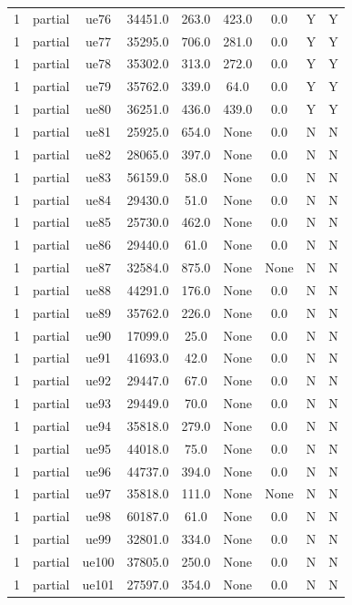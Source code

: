 \begin{table}[ht]
\begin{tabular}{|c|c|c|c|c|c|c|c|c|}
1 & partial & ue76 & 34451.0 & 263.0 & 423.0 & 0.0 & Y & Y \\
1 & partial & ue77 & 35295.0 & 706.0 & 281.0 & 0.0 & Y & Y \\
1 & partial & ue78 & 35302.0 & 313.0 & 272.0 & 0.0 & Y & Y \\
1 & partial & ue79 & 35762.0 & 339.0 & 64.0 & 0.0 & Y & Y \\
1 & partial & ue80 & 36251.0 & 436.0 & 439.0 & 0.0 & Y & Y \\
1 & partial & ue81 & 25925.0 & 654.0 & None & 0.0 & N & N \\
1 & partial & ue82 & 28065.0 & 397.0 & None & 0.0 & N & N \\
1 & partial & ue83 & 56159.0 & 58.0 & None & 0.0 & N & N \\
1 & partial & ue84 & 29430.0 & 51.0 & None & 0.0 & N & N \\
1 & partial & ue85 & 25730.0 & 462.0 & None & 0.0 & N & N \\
1 & partial & ue86 & 29440.0 & 61.0 & None & 0.0 & N & N \\
1 & partial & ue87 & 32584.0 & 875.0 & None & None & N & N \\
1 & partial & ue88 & 44291.0 & 176.0 & None & 0.0 & N & N \\
1 & partial & ue89 & 35762.0 & 226.0 & None & 0.0 & N & N \\
1 & partial & ue90 & 17099.0 & 25.0 & None & 0.0 & N & N \\
1 & partial & ue91 & 41693.0 & 42.0 & None & 0.0 & N & N \\
1 & partial & ue92 & 29447.0 & 67.0 & None & 0.0 & N & N \\
1 & partial & ue93 & 29449.0 & 70.0 & None & 0.0 & N & N \\
1 & partial & ue94 & 35818.0 & 279.0 & None & 0.0 & N & N \\
1 & partial & ue95 & 44018.0 & 75.0 & None & 0.0 & N & N \\
1 & partial & ue96 & 44737.0 & 394.0 & None & 0.0 & N & N \\
1 & partial & ue97 & 35818.0 & 111.0 & None & None & N & N \\
1 & partial & ue98 & 60187.0 & 61.0 & None & 0.0 & N & N \\
1 & partial & ue99 & 32801.0 & 334.0 & None & 0.0 & N & N \\
1 & partial & ue100 & 37805.0 & 250.0 & None & 0.0 & N & N \\
1 & partial & ue101 & 27597.0 & 354.0 & None & 0.0 & N & N \\

\end{tabular}
\end{table}
